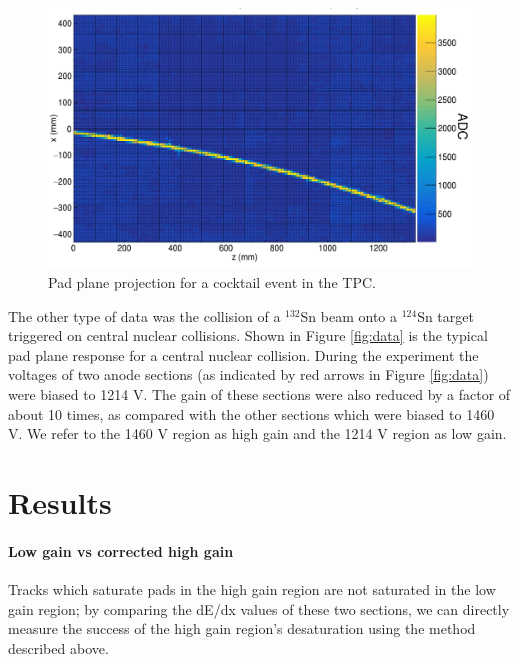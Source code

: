 \documentclass[review]{elsarticle}
\begin{document}
\begin{figure}[H]
\includegraphics[width=\linewidth]{cocktail.png}
\caption{Pad plane projection for a cocktail event in the TPC.}
\label{fig:cocktail}
\end{figure}

The other type of data was the collision of a ${}^{132}$Sn beam onto a ${}^{124}$Sn target triggered on central nuclear collisions. Shown in Figure \ref{fig:data} is the typical pad plane response for a central nuclear collision. During the experiment the voltages of two anode sections (as indicated by red arrows in Figure \ref{fig:data}) were biased to 1214 V. The gain of these sections were also reduced by a factor of about 10 times, as compared with the other sections which were biased to 1460 V. We refer to the 1460 V region as high gain and the 1214 V region as low gain. 


\section{Results}
\paragraph{Low gain vs corrected high gain}

Tracks which saturate pads in the high gain region are not saturated in the low gain region; by comparing the dE/dx values of these two sections, we can directly measure the success of the high gain region's desaturation using the method described above.  
\end{document}
